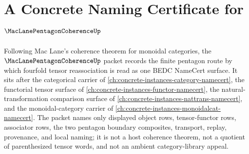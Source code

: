 \chapter{A Concrete Naming Certificate for $\MacLanePentagonCoherenceUp$}
\label{ch:concrete-instances-maclane-pentagon-coherence-namecert}

Following Mac Lane's coherence theorem for monoidal categories, the $\MacLanePentagonCoherenceUp$ packet records the finite pentagon route by which fourfold tensor reassociation is read as one BEDC NameCert surface. It sits after the categorical carrier of \autoref{ch:concrete-instances-category-namecert}, the functorial tensor surface of \autoref{ch:concrete-instances-functor-namecert}, the natural-transformation comparison surface of \autoref{ch:concrete-instances-nattrans-namecert}, and the monoidal-category carrier of \autoref{ch:concrete-instances-monoidalcat-namecert}. The packet names only displayed object rows, tensor-functor rows, associator rows, the two pentagon boundary composites, transport, replay, provenance, and local naming; it is not a host coherence theorem, not a quotient of parenthesized tensor words, and not an ambient category-library appeal.

